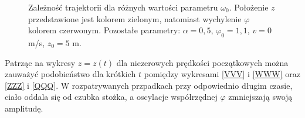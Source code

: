 \documentclass[11pt]{article}
\begin{document}
\begin{figure}[h!]
\begin{center}
\quad
{}
\quad
{}
\caption{Zależność trajektorii dla różnych wartości parametru $\omega_0$. Położenie $z$ przedstawione jest kolorem
	zielonym, natomiast wychylenie $\varphi$ kolorem czerwonym.
	Pozostałe parametry: $\alpha=0,5$, $\varphi_0=1,1$, $v=0 $ m/s, $z_0=5$ m.}{\label{wyko}}
\end{center}
\end{figure}
\newpage
Patrząc na wykresy $z=z(t)$ dla niezerowych prędkości początkowych można zauważyć podobieństwo 
dla krótkich $t$ pomiędzy wykresami \ref{VVV} i \ref{WWW} oraz \ref{ZZZ} i \ref{QQQ}. W rozpatrywanych przpadkach przy odpowiednio długim
czasie, ciało oddala się od czubka stożka, a oscylacje współrzędnej $\varphi$ zmniejszają swoją amplitudę.
\end{document}
